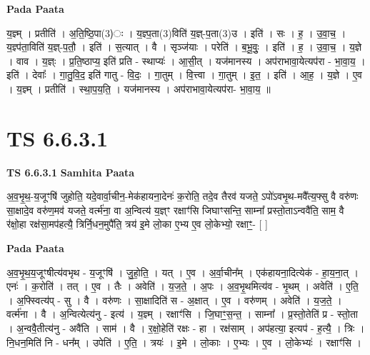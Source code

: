 \documentclass[17pt]{extarticle}
\begin{document}
\textbf{Pada Paata} \newline

य॒ज्ञ्म् । प्रतीति॑ । अ॒ति॒ष्ठि॒पा(3)ः । य॒ज्ञ्प॒ता(3)विति॑ य॒ज्ञ्-प॒ता(3)उ । इति॑ । सः । ह॒ । उ॒वा॒च॒ । य॒ज्ञ्प॑ता॒विति॑ य॒ज्ञ्-प॒तौ॒ । इति॑ । स॒त्यात् । वै । सृञ्ज॑याः । परेति॑ । ब॒भू॒वुः॒ । इति॑ । ह॒ । उ॒वा॒च॒ । य॒ज्ञे । वाव । य॒ज्ञ्ः । प्र॒ति॒ष्ठाप्य॒ इति॑ प्रति - स्थाप्यः॑ । आ॒सी॒त् । यज॑मानस्य । अप॑राभावा॒येत्यप॑रा - भा॒वा॒य॒ । इति॑ । देवाः᳚ । गा॒तु॒वि॒द॒ इति॑ गातु - वि॒दः॒ । गा॒तुम् । वि॒त्त्वा । गा॒तुम् । इ॒त॒ । इति॑ । आ॒ह॒ । य॒ज्ञे । ए॒व । य॒ज्ञ्म् । प्रतीति॑ । स्था॒प॒य॒ति॒ । यज॑मानस्य । अप॑राभावा॒येत्यप॑रा- भा॒वा॒य॒ ॥  \newline





\section{ TS 6.6.3.1 }

\textbf{TS 6.6.3.1 } \newline
\textbf{Samhita Paata} \newline

अ॒व॒भृ॒थ॒-य॒जूꣳषि॑ जुहोति॒ यदे॒वार्वा॒चीन॒-मेक॑हायना॒देनः॑ क॒रोति॒ तदे॒व तैरव॑ यजते॒ ऽपो॑ऽवभृ॒थ-मवै᳚त्य॒फ्सु वै वरु॑णः सा॒क्षादे॒व वरु॑ण॒मव॑ यजते॒ वर्त्म॑ना॒ वा अ॒न्वित्य॑ य॒ज्ञ्ꣳ रक्षाꣳ॑सि जिघाꣳसन्ति॒ साम्ना᳚ प्रस्तो॒ताऽन्ववै॑ति॒ साम॒ वै र॑क्षो॒हा रक्ष॑सा॒मप॑हत्यै॒ त्रिर्नि॒धन॒मुपै॑ति॒ त्रय॑ इ॒मे लो॒का ए॒भ्य ए॒व लो॒केभ्यो॒ रक्षाꣳ॒॒- [  ] \newline

\textbf{Pada Paata} \newline

अ॒व॒भृ॒थ॒य॒जूꣳषीत्य॑वभृथ - य॒जूꣳषि॑ । जु॒हो॒ति॒ । यत् । ए॒व । अ॒र्वा॒चीन᳚म् । एक॑हायना॒दित्येक॑ - हा॒य॒ना॒त् । एनः॑ । क॒रोति॑ । तत् । ए॒व । तैः । अवेति॑ । य॒ज॒ते॒ । अ॒पः । अ॒व॒भृ॒थमित्य॑व - भृ॒थम् । अवेति॑ । ए॒ति॒ । अ॒फ्स्वित्य॑प् - सु । वै । वरु॑णः । सा॒क्षादिति॑ स - अ॒क्षात् । ए॒व । वरु॑णम् । अवेति॑ । य॒ज॒ते॒ । वर्त्म॑ना । वै । अ॒न्वित्येत्य॑नु - इत्य॑ । य॒ज्ञ्म् । रक्षाꣳ॑सि । जि॒घाꣳ॒॒स॒न्त॒ । साम्ना᳚ । प्र॒स्तो॒तेति॑ प्र - स्तो॒ता । अ॒न्ववै॒तीत्य॑नु - अवै॑ति । साम॑ । वै । र॒क्षो॒हेति॑ रक्षः - हा । रक्ष॑साम् । अप॑हत्या॒ इत्यप॑ - ह॒त्यै॒ । त्रिः । नि॒धन॒मिति॑ नि - धन᳚म् । उपेति॑ । ए॒ति॒ । त्रयः॑ । इ॒मे । लो॒काः । ए॒भ्यः । ए॒व । लो॒केभ्यः॑ । रक्षाꣳ॑सि ।  \newline
\end{document}
